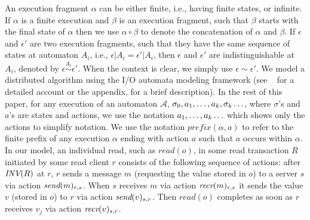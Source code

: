 {%
%
An execution fragment $\alpha$ %
can be either finite, i.e., having finite states, or infinite.
If $\alpha$ is a finite execution and $\beta$ is an execution fragment, such that $\beta$ starts with the final state of $\alpha$ then we use $\alpha \circ \beta$ to denote the concatenation of $\alpha$ and $\beta$.
If $\epsilon$ and $\epsilon'$ are two execution fragments, such that they have the same sequence of states at automaton $A_i$, i.e., $\epsilon|A_i = \epsilon'|A_i$, then $\epsilon$ and $\epsilon'$ are indistinguishable at $A_i$, denoted by $\epsilon \stackrel{A_i}{\sim} \epsilon'$. When the context is clear, we simply use $\epsilon \sim \epsilon'$. 
}
We model a distributed algorithm using the I/O automata modeling framework (see ~\cite{Lynch1996} for a detailed account or the appendix, for a brief description).
In the rest of this paper, for any execution of an automaton $\mathcal{A}$, 
$\finiteprefix{k-1}{k}\ldots$, where $\sigma$'s and $a$'s are states and actions,
we use the notation $\finiteprefixt{k-1}{k}\ldots$ which shows only the actions to simplify notation. 
We use the notation $\textit{prefix}(\alpha, a)$ to refer to the finite prefix of any execution $\alpha$ ending with action  $a$ such that $a$ occurs within $\alpha$.
In our model, an individual read, such as $read(o)$, in some read transaction $R$ initiated by some read client $r$ consists of the following sequence of actions: after $\INV{R}$ at $r$, $r$ sends a message $m$ (requesting the value stored in $o$) to a server $s$ via action $\send{m}{r, s}$. When  $s$ receives $m$ via  action $\recv{m}{r, s}$ it sends the value $v$ (stored in $o$) to $r$  via action $\send{v}{s, r}$. Then $read(o)$ completes as soon as $r$ receives $v_j$ via action  $\recv{v}{s, r}$. 

